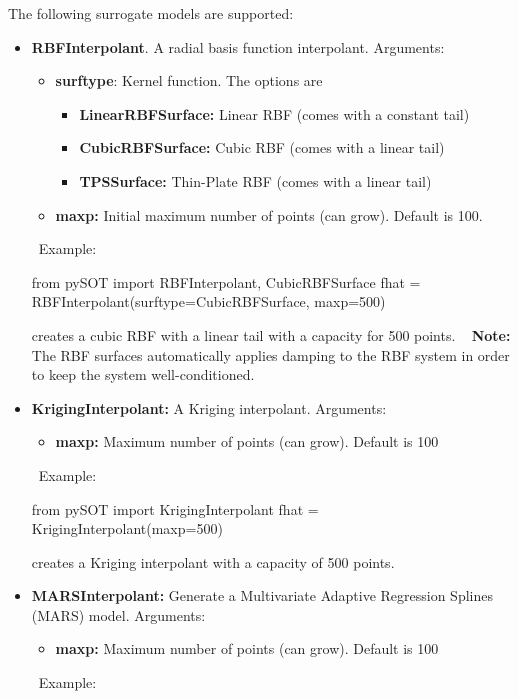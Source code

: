 \documentclass[]{article}
\begin{document}
The following surrogate models are supported:
\begin{itemize}
\item \textbf{RBFInterpolant}. A radial basis function interpolant. Arguments:
\begin{itemize}
\item \textbf{surftype}: Kernel function. The options are 
\begin{itemize}
\item \textbf{LinearRBFSurface:} Linear RBF (comes with a constant tail)
\item \textbf{CubicRBFSurface:} Cubic RBF (comes with a linear tail)
\item \textbf{TPSSurface:} Thin-Plate RBF (comes with a linear tail)
\end{itemize}
\item \textbf{maxp:} Initial maximum number of points (can grow). Default is 100.
\end{itemize}
\ \newline Example:
\begin{python}
from pySOT import RBFInterpolant, CubicRBFSurface
fhat = RBFInterpolant(surftype=CubicRBFSurface, maxp=500)
\end{python}
creates a cubic RBF with a linear tail with a capacity for 500 points.  \newline \ \newline
\textbf{Note:} The RBF surfaces automatically applies damping to the RBF system in order to keep the system well-conditioned. 
\item \textbf{KrigingInterpolant:} A Kriging interpolant. Arguments:
\begin{itemize}
\item \textbf{maxp:} Maximum number of points (can grow). Default is 100
\end{itemize}
\ \newline Example:
\begin{python}
from pySOT import KrigingInterpolant
fhat = KrigingInterpolant(maxp=500)
\end{python}
creates a Kriging interpolant with a capacity of 500 points.
\item \textbf{MARSInterpolant:} Generate a Multivariate Adaptive Regression Splines (MARS) model. Arguments:
\begin{itemize}
\item \textbf{maxp:} Maximum number of points (can grow). Default is 100
\end{itemize}
\ \newline Example: 

\end{itemize}
\end{document}
